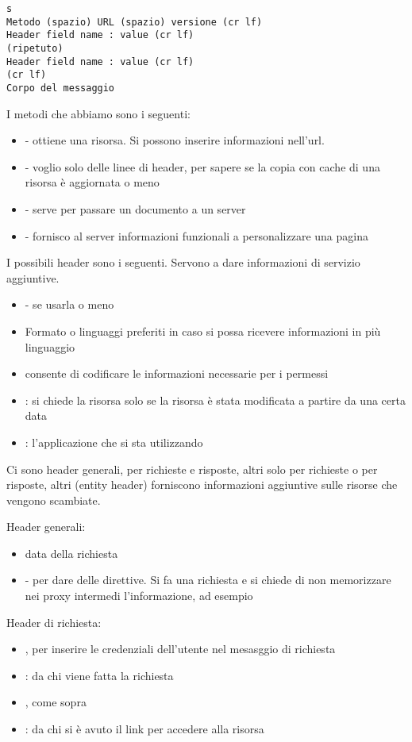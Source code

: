 \begin{verbatim}s
Metodo (spazio) URL (spazio) versione (cr lf)
Header field name : value (cr lf)
(ripetuto)
Header field name : value (cr lf)
(cr lf)
Corpo del messaggio
\end{verbatim}

I metodi che abbiamo sono i seguenti:
\begin{itemize}
    \item {} - ottiene una risorsa. Si possono inserire informazioni nell'url.
    \item {} - voglio solo delle linee di header, per sapere se la copia con cache di una risorsa \`e aggiornata o meno
    \item {} - serve per passare un documento a un server
    \item {} - fornisco al server informazioni funzionali a personalizzare una pagina
\end{itemize}

I possibili header sono i seguenti. Servono a dare informazioni di servizio aggiuntive.
\begin{itemize}
    \item {} - se usarla o meno
    \item Formato o linguaggi preferiti in caso si possa ricevere informazioni in pi\`u linguaggio
    \item {} consente di codificare le informazioni necessarie per i permessi
    \item {}: si chiede la risorsa solo se la risorsa \`e stata modificata a partire da una certa data
    \item {}: l'applicazione che si sta utilizzando
\end{itemize}

Ci sono header generali, per richieste e risposte, altri solo per richieste o per risposte, altri (entity header) forniscono informazioni aggiuntive sulle risorse che vengono scambiate.

Header generali:
\begin{itemize}
    \item data della richiesta
    \item {} - per dare delle direttive. Si fa una richiesta e si chiede di non memorizzare nei proxy intermedi l'informazione, ad esempio
\end{itemize}

Header di richiesta:
\begin{itemize}
    \item {}, per inserire le credenziali dell'utente nel mesasggio di richiesta
    \item {}: da chi viene fatta la richiesta
    \item {}, come sopra
    \item {}: da chi si \`e avuto il link per accedere alla risorsa
\end{itemize}

